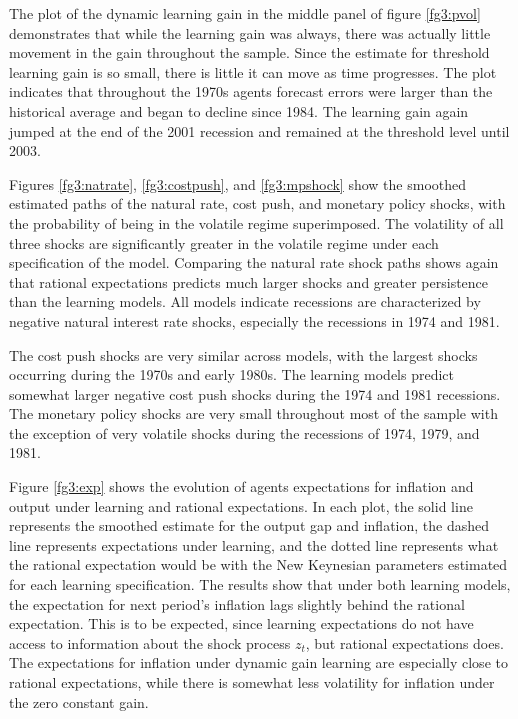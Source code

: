 The plot of the dynamic learning gain in the middle panel of figure \ref{fg3:pvol} demonstrates that while the learning gain was always, there was actually little movement in the gain throughout the sample.  Since the estimate for threshold learning gain is so small, there is little it can move as time progresses.  The plot indicates that throughout the 1970s agents forecast errors were larger than the historical average and began to decline since 1984.  The learning gain again jumped at the end of the 2001 recession and remained at the threshold level until 2003.

Figures \ref{fg3:natrate}, \ref{fg3:costpush}, and \ref{fg3:mpshock} show the smoothed estimated paths of the natural rate, cost push, and monetary policy shocks, with the probability of being in the volatile regime superimposed.  The volatility of all three shocks are significantly greater in the volatile regime under each specification of the model.  Comparing the natural rate shock paths shows again that rational expectations predicts much larger shocks and greater persistence than the learning models.  All models indicate recessions are characterized by negative natural interest rate shocks, especially the recessions in 1974 and 1981. 

The cost push shocks are very similar across models, with the largest shocks occurring during the 1970s and early 1980s.  The learning models predict somewhat larger negative cost push shocks during the 1974 and 1981 recessions.  The monetary policy shocks are very small throughout most of the sample with the exception of very volatile shocks during the recessions of 1974, 1979, and 1981. 

Figure \ref{fg3:exp} shows the evolution of agents expectations for inflation and output under learning and rational expectations.  In each plot, the solid line represents the smoothed estimate for the output gap and inflation, the dashed line represents expectations under learning, and the dotted line represents what the rational expectation would be with the New Keynesian parameters estimated for each learning specification.  The results show that under both learning models, the expectation for next period's inflation lags slightly behind the rational expectation.  This is to be expected, since learning expectations do not have access to information about the shock process $z_t$, but rational expectations does.  The expectations for inflation under dynamic gain learning are especially close to rational expectations, while there is somewhat less volatility for inflation under the zero constant gain.

